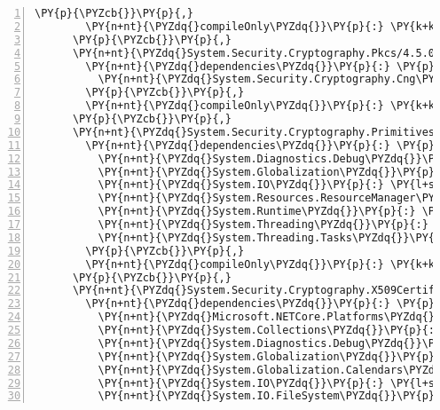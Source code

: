 \begin{Verbatim}[commandchars=\\\{\},numbers=left,firstnumber=1,stepnumber=1,numberblanklines=0]
        \PY{p}{\PYZcb{}}\PY{p}{,}
        \PY{n+nt}{\PYZdq{}compileOnly\PYZdq{}}\PY{p}{:} \PY{k+kc}{true}
      \PY{p}{\PYZcb{}}\PY{p}{,}
      \PY{n+nt}{\PYZdq{}System.Security.Cryptography.Pkcs/4.5.0\PYZhy{}rc1\PYZdq{}}\PY{p}{:} \PY{p}{\PYZob{}}
        \PY{n+nt}{\PYZdq{}dependencies\PYZdq{}}\PY{p}{:} \PY{p}{\PYZob{}}
          \PY{n+nt}{\PYZdq{}System.Security.Cryptography.Cng\PYZdq{}}\PY{p}{:} \PY{l+s+s2}{\PYZdq{}4.5.0\PYZhy{}rc1\PYZdq{}}
        \PY{p}{\PYZcb{}}\PY{p}{,}
        \PY{n+nt}{\PYZdq{}compileOnly\PYZdq{}}\PY{p}{:} \PY{k+kc}{true}
      \PY{p}{\PYZcb{}}\PY{p}{,}
      \PY{n+nt}{\PYZdq{}System.Security.Cryptography.Primitives/4.3.0\PYZdq{}}\PY{p}{:} \PY{p}{\PYZob{}}
        \PY{n+nt}{\PYZdq{}dependencies\PYZdq{}}\PY{p}{:} \PY{p}{\PYZob{}}
          \PY{n+nt}{\PYZdq{}System.Diagnostics.Debug\PYZdq{}}\PY{p}{:} \PY{l+s+s2}{\PYZdq{}4.3.0\PYZdq{}}\PY{p}{,}
          \PY{n+nt}{\PYZdq{}System.Globalization\PYZdq{}}\PY{p}{:} \PY{l+s+s2}{\PYZdq{}4.3.0\PYZdq{}}\PY{p}{,}
          \PY{n+nt}{\PYZdq{}System.IO\PYZdq{}}\PY{p}{:} \PY{l+s+s2}{\PYZdq{}4.3.0\PYZdq{}}\PY{p}{,}
          \PY{n+nt}{\PYZdq{}System.Resources.ResourceManager\PYZdq{}}\PY{p}{:} \PY{l+s+s2}{\PYZdq{}4.3.0\PYZdq{}}\PY{p}{,}
          \PY{n+nt}{\PYZdq{}System.Runtime\PYZdq{}}\PY{p}{:} \PY{l+s+s2}{\PYZdq{}4.3.0\PYZdq{}}\PY{p}{,}
          \PY{n+nt}{\PYZdq{}System.Threading\PYZdq{}}\PY{p}{:} \PY{l+s+s2}{\PYZdq{}4.3.0\PYZdq{}}\PY{p}{,}
          \PY{n+nt}{\PYZdq{}System.Threading.Tasks\PYZdq{}}\PY{p}{:} \PY{l+s+s2}{\PYZdq{}4.3.0\PYZdq{}}
        \PY{p}{\PYZcb{}}\PY{p}{,}
        \PY{n+nt}{\PYZdq{}compileOnly\PYZdq{}}\PY{p}{:} \PY{k+kc}{true}
      \PY{p}{\PYZcb{}}\PY{p}{,}
      \PY{n+nt}{\PYZdq{}System.Security.Cryptography.X509Certificates/4.3.0\PYZdq{}}\PY{p}{:} \PY{p}{\PYZob{}}
        \PY{n+nt}{\PYZdq{}dependencies\PYZdq{}}\PY{p}{:} \PY{p}{\PYZob{}}
          \PY{n+nt}{\PYZdq{}Microsoft.NETCore.Platforms\PYZdq{}}\PY{p}{:} \PY{l+s+s2}{\PYZdq{}2.1.0\PYZhy{}rc1\PYZdq{}}\PY{p}{,}
          \PY{n+nt}{\PYZdq{}System.Collections\PYZdq{}}\PY{p}{:} \PY{l+s+s2}{\PYZdq{}4.3.0\PYZdq{}}\PY{p}{,}
          \PY{n+nt}{\PYZdq{}System.Diagnostics.Debug\PYZdq{}}\PY{p}{:} \PY{l+s+s2}{\PYZdq{}4.3.0\PYZdq{}}\PY{p}{,}
          \PY{n+nt}{\PYZdq{}System.Globalization\PYZdq{}}\PY{p}{:} \PY{l+s+s2}{\PYZdq{}4.3.0\PYZdq{}}\PY{p}{,}
          \PY{n+nt}{\PYZdq{}System.Globalization.Calendars\PYZdq{}}\PY{p}{:} \PY{l+s+s2}{\PYZdq{}4.3.0\PYZdq{}}\PY{p}{,}
          \PY{n+nt}{\PYZdq{}System.IO\PYZdq{}}\PY{p}{:} \PY{l+s+s2}{\PYZdq{}4.3.0\PYZdq{}}\PY{p}{,}
          \PY{n+nt}{\PYZdq{}System.IO.FileSystem\PYZdq{}}\PY{p}{:} \PY{l+s+s2}{\PYZdq{}4.3.0\PYZdq{}}\PY{p}{,}

\end{Verbatim}
